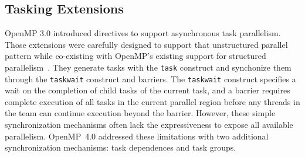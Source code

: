 \subsection{Tasking Extensions}
\label{sub:tasking}

OpenMP 3.0 introduced directives to support asynchronous task parallelism. 
Those extensions were carefully designed to support that unstructured 
parallel pattern while co-existing with OpenMP's existing support for 
structured parallelism~\cite{ayguade2009tpds}. They generate tasks with the 
\texttt{task} construct and synchonize them through the \texttt{taskwait} 
construct and barriers. The \texttt{taskwait} construct specifies a wait 
on the completion of child tasks of the current task, and a barrier requires 
complete execution of all tasks in the current parallel region before any 
threads in the team can continue execution beyond the barrier. However, these 
simple synchronization mechanisms often lack the expressiveness to expose all 
available parallelism. OpenMP~4.0 addressed these limitations with two 
additional synchronization mechanisms: task dependences and task groups.

